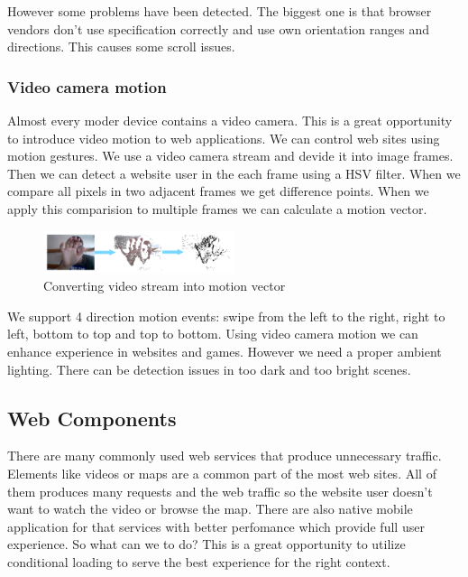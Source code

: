 \documentclass{iitsrc}
\begin{document}
However some problems have been detected. The biggest one is that browser vendors don't use specification correctly and use own orientation ranges and directions. This causes some scroll issues.


\subsubsection{Video camera motion} %
\label{ssub:video_camera_motion}

Almost every moder device contains a video camera. This is a great opportunity to introduce video motion to web applications. We can control web sites using motion gestures. We use a video camera stream and devide it into image frames. Then we can detect a website user in the each frame using a HSV filter. When we compare all pixels in two adjacent frames we get difference points. When we apply this comparision to multiple frames we can calculate a motion vector.

\begin{figure}[ht]
    \begin{center}
        \includegraphics[width=0.5\textwidth]{../images/videomotion}
        \caption{Converting video stream into motion vector}
        \label{fig:videomotion}
    \end{center}
\end{figure}

We support 4 direction motion events: swipe from the left to the right, right to left, bottom to top and top to bottom. Using video camera motion we can enhance experience in websites and games. However we need a proper ambient lighting. There can be detection issues in too dark and too bright scenes.




\subsection{Web Components} %
\label{sub:web_components}

There are many commonly used web services that produce unnecessary traffic. Elements like videos or maps are a common part of the most web sites. All of them produces many requests and the web traffic so the website user doesn't want to watch the video or browse the map. There are also native mobile application for that services with better perfomance which provide full user experience. So what can we to do? This is a great opportunity to utilize conditional loading to serve the best experience for the right context.
\end{document}
